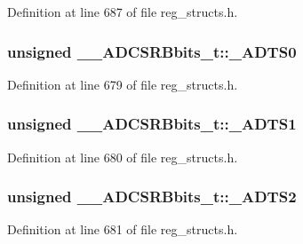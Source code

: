 Definition at line 687 of file reg\+\_\+structs.\+h.

\hypertarget{union_____a_d_c_s_r_bbits__t_a103c16c4d0a7ae86245bc3f5a170196c}{
\subsubsection[{\+\_\+\+A\+D\+T\+S0}]{\setlength{\rightskip}{0pt plus 5cm}unsigned \+\_\+\+\_\+\+A\+D\+C\+S\+R\+Bbits\+\_\+t\+::\+\_\+\+A\+D\+T\+S0}}\label{union_____a_d_c_s_r_bbits__t_a103c16c4d0a7ae86245bc3f5a170196c}


Definition at line 679 of file reg\+\_\+structs.\+h.

\hypertarget{union_____a_d_c_s_r_bbits__t_a290301f179d6d0e7840840ef5626dfa2}{
\subsubsection[{\+\_\+\+A\+D\+T\+S1}]{\setlength{\rightskip}{0pt plus 5cm}unsigned \+\_\+\+\_\+\+A\+D\+C\+S\+R\+Bbits\+\_\+t\+::\+\_\+\+A\+D\+T\+S1}}\label{union_____a_d_c_s_r_bbits__t_a290301f179d6d0e7840840ef5626dfa2}


Definition at line 680 of file reg\+\_\+structs.\+h.

\hypertarget{union_____a_d_c_s_r_bbits__t_a337f192f4bffddc8ebc0aea77f66d2a1}{
\subsubsection[{\+\_\+\+A\+D\+T\+S2}]{\setlength{\rightskip}{0pt plus 5cm}unsigned \+\_\+\+\_\+\+A\+D\+C\+S\+R\+Bbits\+\_\+t\+::\+\_\+\+A\+D\+T\+S2}}\label{union_____a_d_c_s_r_bbits__t_a337f192f4bffddc8ebc0aea77f66d2a1}


Definition at line 681 of file reg\+\_\+structs.\+h.


